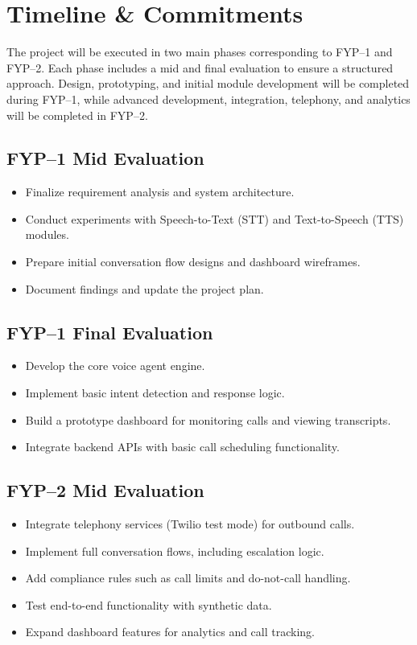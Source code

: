 \documentclass[12pt,a4paper]{report}
\begin{document}
\section{Timeline \& Commitments}

The project will be executed in two main phases corresponding to FYP–1 and FYP–2. Each phase includes a mid and final evaluation to ensure a structured approach. Design, prototyping, and initial module development will be completed during FYP–1, while advanced development, integration, telephony, and analytics will be completed in FYP–2.

\subsection{FYP–1 Mid Evaluation}
\begin{itemize}
    \item Finalize requirement analysis and system architecture.
    \item Conduct experiments with Speech-to-Text (STT) and Text-to-Speech (TTS) modules.
    \item Prepare initial conversation flow designs and dashboard wireframes.
    \item Document findings and update the project plan.
\end{itemize}

\subsection{FYP–1 Final Evaluation}
\begin{itemize}
    \item Develop the core voice agent engine.
    \item Implement basic intent detection and response logic.
    \item Build a prototype dashboard for monitoring calls and viewing transcripts.
    \item Integrate backend APIs with basic call scheduling functionality.
\end{itemize}

\subsection{FYP–2 Mid Evaluation}
\begin{itemize}
    \item Integrate telephony services (Twilio test mode) for outbound calls.
    \item Implement full conversation flows, including escalation logic.
    \item Add compliance rules such as call limits and do-not-call handling.
    \item Test end-to-end functionality with synthetic data.
    \item Expand dashboard features for analytics and call tracking.
\end{itemize}
\end{document}
